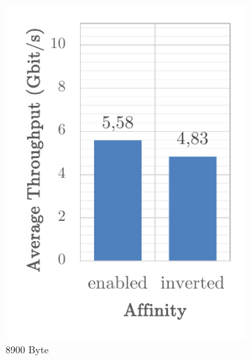 \begin{figure}[h]
\begin{subfigure}[b]{0.32\textwidth}
        \includegraphics[width=\textwidth]{figures/reliability/ihawk/diagr10b.pdf}
        \caption{8900 Byte}
    \end{subfigure}
    \hfill
    \begin{subfigure}[b]{0.32\textwidth}
        \centering

\end{subfigure}
\end{figure}
